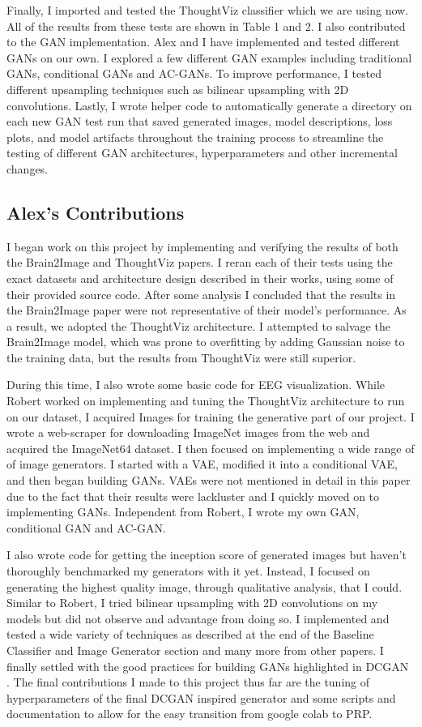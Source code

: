 \documentclass[sigplan,screen]{acmart}
\begin{document}
Finally, I imported and tested the ThoughtViz classifier which we are using now. All of the results from these tests are shown in Table 1 and 2.
I also contributed to the GAN implementation. Alex and I have implemented and tested different GANs on our own. I explored a few different GAN examples including traditional GANs, conditional GANs and AC-GANs. To improve performance, I tested different upsampling techniques such as bilinear upsampling with 2D convolutions. Lastly, I wrote helper code to automatically generate a directory on each new GAN test run that saved generated images, model descriptions, loss plots, and model artifacts throughout the training process to streamline the testing of different GAN architectures, hyperparameters and other incremental changes.


\subsection{Alex's Contributions}
I began work on this project by implementing and verifying the results of both the Brain2Image and ThoughtViz papers. I reran each of their tests using the exact datasets and architecture design described in their works, using some of their provided source code. After some analysis I concluded that the results in the Brain2Image paper were not representative of their model's performance. As a result, we adopted the ThoughtViz architecture. I attempted to salvage the Brain2Image model, which was prone to overfitting by adding Gaussian noise to the training data, but the results from ThoughtViz were still superior. 

During this time, I also wrote some basic code for EEG visualization. While Robert worked on implementing and tuning the ThoughtViz architecture to run on our dataset, I acquired Images for training the generative part of our project. I wrote a web-scraper for downloading ImageNet images from the web and acquired the ImageNet64 dataset. I then focused on implementing a wide range of of image generators. I started with a VAE, modified it into a conditional VAE, and then began building GANs. VAEs were not mentioned in detail in this paper due to the fact that their results were lackluster and I quickly moved on to implementing GANs. Independent from Robert, I wrote my own GAN, conditional GAN and AC-GAN. 

I also wrote code for getting the inception score of generated images but haven't thoroughly benchmarked my generators with it yet. Instead, I focused on generating the highest quality image, through qualitative analysis, that I could. Similar to Robert, I tried bilinear upsampling with 2D convolutions on my models but did not observe and advantage from doing so. I implemented and tested a wide variety of techniques as described at the end of the Baseline Classifier and Image Generator section and many more from other papers. I finally settled with the good practices for building GANs highlighted in DCGAN \cite{radford2016unsupervised}. The final contributions I made to this project thus far are the tuning of hyperparameters of the final DCGAN inspired generator and some scripts and documentation to allow for the easy transition from google colab to PRP.  




\end{document}

